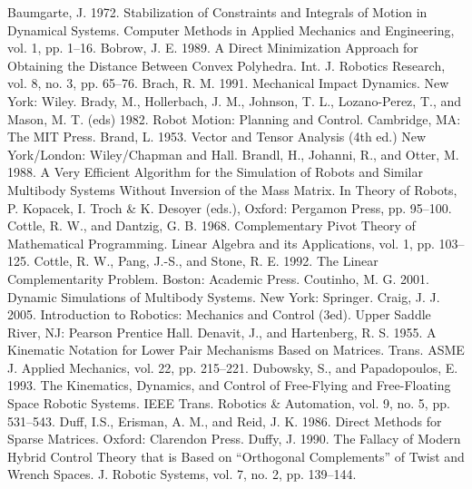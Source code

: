 Baumgarte, J. 1972. Stabilization of Constraints and Integrals of Motion in Dynamical Systems. Computer Methods in Applied Mechanics and Engineering, vol. 1, pp. 1–16. Bobrow, J. E. 1989. A Direct Minimization Approach for Obtaining the Distance Between Convex Polyhedra. Int. J. Robotics Research, vol. 8, no. 3, pp. 65–76. Brach, R. M. 1991. Mechanical Impact Dynamics. New York: Wiley. Brady, M., Hollerbach, J. M., Johnson, T. L., Lozano-Perez, T., and Mason, M. T. (eds) 1982. Robot Motion: Planning and Control. Cambridge, MA: The MIT Press. Brand, L. 1953. Vector and Tensor Analysis (4th ed.) New York/London: Wiley/Chapman and Hall. Brandl, H., Johanni, R., and Otter, M. 1988. A Very Efficient Algorithm for the Simulation of Robots and Similar Multibody Systems Without Inversion of the Mass Matrix. In Theory of Robots, P. Kopacek, I. Troch \& K. Desoyer (eds.), Oxford: Pergamon Press, pp. 95–100. Cottle, R. W., and Dantzig, G. B. 1968. Complementary Pivot Theory of Mathematical Programming. Linear Algebra and its Applications, vol. 1, pp. 103– 125. Cottle, R. W., Pang, J.-S., and Stone, R. E. 1992. The Linear Complementarity Problem. Boston: Academic Press. Coutinho, M. G. 2001. Dynamic Simulations of Multibody Systems. New York: Springer. Craig, J. J. 2005. Introduction to Robotics: Mechanics and Control (3ed). Upper Saddle River, NJ: Pearson Prentice Hall. Denavit, J., and Hartenberg, R. S. 1955. A Kinematic Notation for Lower Pair Mechanisms Based on Matrices. Trans. ASME J. Applied Mechanics, vol. 22, pp. 215–221. Dubowsky, S., and Papadopoulos, E. 1993. The Kinematics, Dynamics, and Control of Free-Flying and Free-Floating Space Robotic Systems. IEEE Trans. Robotics \& Automation, vol. 9, no. 5, pp. 531–543. Duff, I.S., Erisman, A. M., and Reid, J. K. 1986. Direct Methods for Sparse Matrices. Oxford: Clarendon Press. Duffy, J. 1990. The Fallacy of Modern Hybrid Control Theory that is Based on “Orthogonal Complements” of Twist and Wrench Spaces. J. Robotic Systems, vol. 7, no. 2, pp. 139–144.

